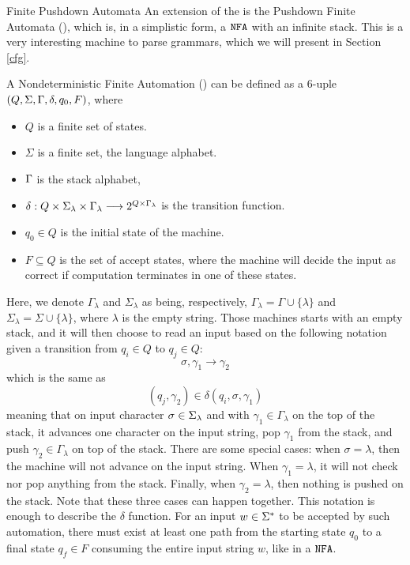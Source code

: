 \begin{section}{Finite Pushdown Automata}
	An extension of the \NFA is the Pushdown Finite Automata (), which
	is, in a simplistic form, a $\texttt{NFA}$ with an infinite stack. This is a very
	interesting machine to parse grammars, which we will present in Section
	\ref{cfg}.

\begin{definition}
A Nondeterministic Finite Automation () can be defined as a 6-uple
$(Q, \Sigma, \Gamma, \delta, q_0, F)$, where
\begin{itemize}

\item $Q$ is a finite set of states.
\item $\Sigma$ is a finite set, the language alphabet.
\item $\Gamma$ is the stack alphabet,
\item $\delta:Q\times\Sigma_\lambda \times \Gamma_\lambda \longrightarrow 2^{Q \times \Gamma_\lambda}$ is the transition function.
\item $q_0 \in Q$ is the initial state of the machine.
\item $F \subseteq Q$ is the set of accept states, where the machine will
decide the input as correct if computation terminates in one of these
states.
\end{itemize}
\end{definition}
Here, we denote $\Gamma_\lambda$ and $\Sigma_\lambda$ as being, respectively,
$\Gamma_\lambda = \Gamma \cup \{\lambda\}$ and $\Sigma_\lambda = \Sigma \cup
\{\lambda\}$, where $\lambda$ is the empty string. Those machines starts with
an empty stack, and it will then choose to read an input based on the following
notation given a transition from $q_i \in Q$ to $q_j \in Q$: $$\sigma, \gamma_1
\rightarrow \gamma_2$$ which is the same as $$(q_j, \gamma_2) \in \delta(q_i,
\sigma, \gamma_1)$$ meaning that on input character $\sigma \in \Sigma_\lambda$
and with $\gamma_1 \in \Gamma_\lambda$ on the top of the stack, it advances one
character on the input string, pop $\gamma_1$ from the stack, and push
$\gamma_2 \in \Gamma_\lambda$ on top of the stack. There are some special
cases: when $\sigma = \lambda$, then the machine will not advance on the input
string. When $\gamma_1 = \lambda$, it will not check nor pop anything from the
stack. Finally, when $\gamma_2 = \lambda$, then nothing is pushed on the stack.
Note that these three cases can happen together. This notation is enough to
describe the $\delta$ function.  For an input $w \in \Sigma^*$ to be accepted by
such automation, there must exist at least one path from the starting state
$q_0$ to a final state $q_f \in F$ consuming the entire input string $w$, like
in a $\texttt{NFA}$.


\end{section}
